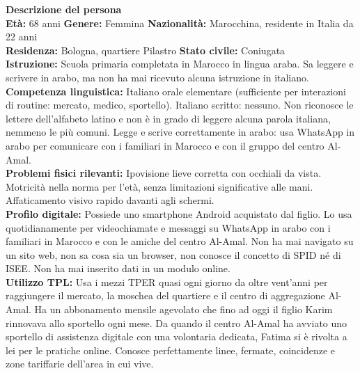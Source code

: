\documentclass[11pt,a4paper]{article}
\begin{document}
\begin{center}
\begin{tcolorbox}[colback=backgroundColor,colframe=borderColor,arc=2mm]
    \textbf{Descrizione del persona} \\[4pt]
    {\small
    \textbf{Età:} 68 anni \hfill
    \textbf{Genere:} Femmina \hfill
    \textbf{Nazionalità:} Marocchina, residente in Italia da 22 anni
    \\[2pt]
    \textbf{Residenza:} Bologna, quartiere Pilastro \hfill
    \textbf{Stato civile:} Coniugata \\[2pt]
    \textbf{Istruzione:} Scuola primaria completata in Marocco
    in lingua araba. Sa leggere e scrivere in arabo,
    ma non ha mai ricevuto alcuna istruzione in italiano. \\[2pt]
    \textbf{Competenza linguistica:} Italiano orale elementare
    (sufficiente per interazioni di routine: mercato, medico,
    sportello). Italiano scritto: nessuno. Non riconosce le
    lettere dell'alfabeto latino e non è in grado di leggere
    alcuna parola italiana, nemmeno le più comuni.
    Legge e scrive correttamente in arabo: usa WhatsApp
    in arabo per comunicare con i familiari in Marocco
    e con il gruppo del centro Al-Amal. \\[2pt]
    \textbf{Problemi fisici rilevanti:} Ipovisione lieve
    corretta con occhiali da vista. Motricità nella norma
    per l'età, senza limitazioni significative alle mani.
    Affaticamento visivo rapido davanti agli schermi. \\[2pt]
    \textbf{Profilo digitale:} Possiede uno smartphone Android
    acquistato dal figlio. Lo usa quotidianamente per
    videochiamate e messaggi su WhatsApp in arabo con
    i familiari in Marocco e con le amiche del centro Al-Amal.
    Non ha mai navigato su un sito web, non sa cosa sia
    un browser, non conosce il concetto di SPID né di ISEE.
    Non ha mai inserito dati in un modulo online. \\[2pt]
    \textbf{Utilizzo TPL:} Usa i mezzi TPER quasi ogni giorno
da oltre vent'anni per raggiungere il mercato, la moschea
del quartiere e il centro di aggregazione Al-Amal.
Ha un abbonamento mensile agevolato che fino ad oggi
il figlio Karim rinnovava allo sportello ogni mese.
Da quando il centro Al-Amal ha avviato uno sportello
di assistenza digitale con una volontaria dedicata,
Fatima si è rivolta a lei per le pratiche online.
Conosce perfettamente linee, fermate, coincidenze
e zone tariffarie dell'area in cui vive.
    }
\end{tcolorbox}


\end{center}
\end{document}
